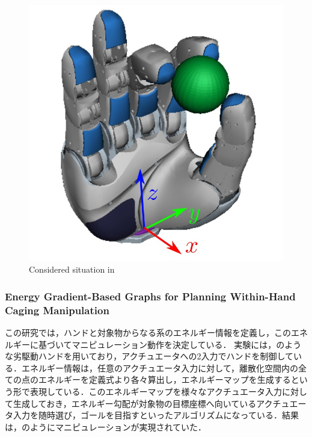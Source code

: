 \documentclass[a4paper,twoside,12pt,papersize, dvipdfmx]{iirthesis}
\begin{document}
\begin{figure}[b]
\begin{minipage}{0.33\hsize}
\end{minipage}\hfill
\begin{minipage}{0.33\hsize}
\includegraphics[width=0.98\hsize]{fig/1-introduction/Hertkorn/fig3.jpg}
\end{minipage}
\caption{Considered situation in \cite{hertkorn2013}}\label{fig::intro::hertkorn}
\end{figure}

\subsubsection{Energy Gradient-Based Graphs for Planning Within-Hand Caging Manipulation \cite{bircher2019}}
この研究では，ハンドと対象物からなる系のエネルギー情報を定義し，このエネルギーに基づいてマニピュレーション動作を決定している．
実験には，のような劣駆動ハンドを用いており，アクチュエータへの2入力でハンドを制御している．エネルギー情報は，任意のアクチュエータ入力に対して，離散化空間内の全ての点のエネルギーを定義式より各々算出し，エネルギーマップを生成するという形で表現している．このエネルギーマップを様々なアクチュエータ入力に対して生成しておき，エネルギー勾配が対象物の目標座標へ向いているアクチュエータ入力を随時選び，ゴールを目指すといったアルゴリズムになっている．結果は，のようにマニピュレーションが実現されていた．
\end{document}

